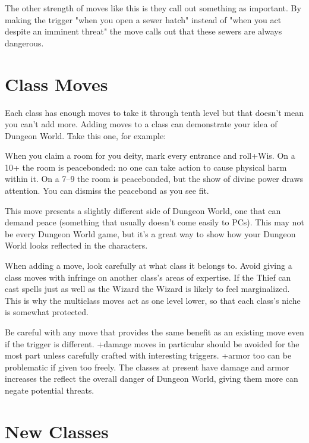        

The other strength of moves like this is they call out something as important. By making the trigger "when you open a sewer hatch" instead of "when you act despite an imminent threat" the move calls out that these sewers are always dangerous.

       
\section{Class Moves}    
       

Each class has enough moves to take it through tenth level but that doesn't mean you can't add more. Adding moves to a class can demonstrate your idea of Dungeon World. Take this one, for example:

       
\startExample
When you claim a room for you deity, mark every entrance and roll+Wis. On a 10+ the room is peacebonded: no one can take action to cause physical harm within it. On a 7–9 the room is peacebonded, but the show of divine power draws attention. You can dismiss the peacebond as you see fit.
\stopExample
       

This move presents a slightly different side of Dungeon World, one that can demand peace (something that usually doesn't come easily to PCs). This may not be every Dungeon World game, but it's a great way to show how your Dungeon World looks reflected in the characters.

       

When adding a move, look carefully at what class it belongs to. Avoid giving a class moves with infringe on another class's areas of expertise. If the Thief can cast spells just as well as the Wizard the Wizard is likely to feel marginalized. This is why the multiclass moves act as one level lower, so that each class's niche is somewhat protected.

       

Be careful with any move that provides the same benefit as an existing move even if the trigger is different. +damage moves in particular should be avoided for the most part unless carefully crafted with interesting triggers. +armor too can be problematic if given too freely. The classes at present have damage and armor increases the reflect the overall danger of Dungeon World, giving them more can negate potential threats.

       
\section{New Classes}   
       

